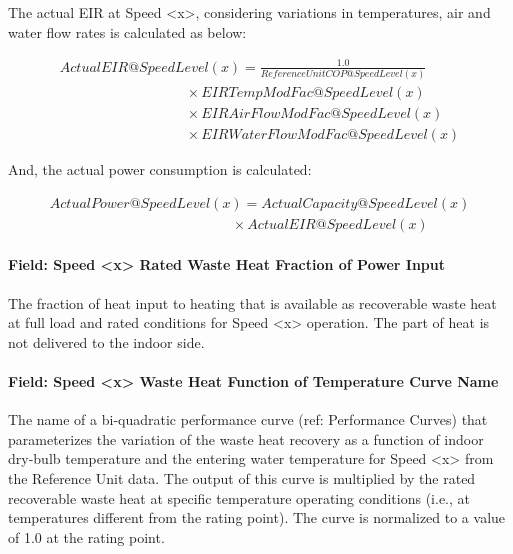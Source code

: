 The actual EIR at Speed \textless{}x\textgreater{}, considering variations in temperatures, air and water flow rates is calculated as below:

\begin{equation}
\begin{array}{l}
ActualEIR@SpeedLevel \left( x \right) = \frac{{1.0}}{{ReferenceUnitCOP@SpeedLevel(x)}} \\
\quad \quad \quad \quad \quad \quad \quad \quad \quad \times EIRTempModFac@SpeedLevel(x) \\
\quad \quad \quad \quad \quad \quad \quad \quad \quad \times EIRAirFlowModFac@SpeedLevel(x) \\
\quad \quad \quad \quad \quad \quad \quad \quad \quad \times EIRWaterFlowModFac@SpeedLevel(x)
\end{array}
\end{equation}

And, the actual power consumption is calculated:

\begin{equation}
\begin{array}{l}
ActualPower@SpeedLevel\left( x \right) = ActualCapacity@SpeedLevel\left( x \right) \\
\quad \quad \quad \quad \quad \quad \quad \quad \quad \quad \quad \quad \quad \times ActualEIR@SpeedLevel\left( x \right)
\end{array}
\end{equation}

\paragraph{Field: Speed \textless{}x\textgreater{} Rated Waste Heat Fraction of Power Input}\label{field-speed-x-rated-waste-heat-fraction-of-power-input-2}

The fraction of heat input to heating that is available as recoverable waste heat at full load and rated conditions for Speed \textless{}x\textgreater{} operation. The part of heat is not delivered to the indoor side.

\paragraph{Field: Speed \textless{}x\textgreater{} Waste Heat Function of Temperature Curve Name}\label{field-speed-x-waste-heat-function-of-temperature-curve-name-3}

The name of a bi-quadratic performance curve (ref: Performance Curves) that parameterizes the variation of the waste heat recovery as a function of indoor dry-bulb temperature and the entering water temperature for Speed \textless{}x\textgreater{} from the Reference Unit data. The output of this curve is multiplied by the rated recoverable waste heat at specific temperature operating conditions (i.e., at temperatures different from the rating point). The curve is normalized to a value of 1.0 at the rating point.

